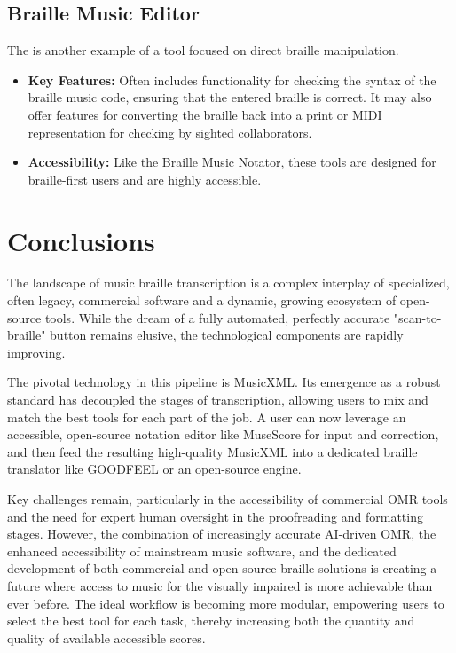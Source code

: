 \subsection{Braille Music Editor}\label{ch10:ssec:braille-music-editor}
The  is another example of a tool focused on direct braille manipulation.
\begin{itemize}
	\item \textbf{Key Features:} Often includes functionality for checking the syntax of the braille music code, ensuring that the entered braille is correct. It may also offer features for converting the braille back into a print or MIDI representation for checking by sighted collaborators.
	\item \textbf{Accessibility:} Like the Braille Music Notator, these tools are designed for braille-first users and are highly accessible.
\end{itemize}

\section{Conclusions}\label{ch10:sec:conclusions}
The landscape of music braille transcription is a complex interplay of specialized, often legacy, commercial software and a dynamic, growing ecosystem of open-source tools. While the dream of a fully automated, perfectly accurate "scan-to-braille" button remains elusive, the technological components are rapidly improving.

The pivotal technology in this pipeline is \gls{MusicXML}. Its emergence as a robust standard has decoupled the stages of transcription, allowing users to mix and match the best tools for each part of the job. A user can now leverage an accessible, open-source notation editor like MuseScore for input and correction, and then feed the resulting high-quality \gls{MusicXML} into a dedicated braille translator like GOODFEEL or an open-source engine.

Key challenges remain, particularly in the accessibility of commercial \gls{OMR} tools and the need for expert human oversight in the proofreading and formatting stages. However, the combination of increasingly accurate AI-driven \gls{OMR}, the enhanced accessibility of mainstream music software, and the dedicated development of both commercial and open-source braille solutions is creating a future where access to music for the visually impaired is more achievable than ever before. The ideal workflow is becoming more modular, empowering users to select the best tool for each task, thereby increasing both the quantity and quality of available accessible scores.
